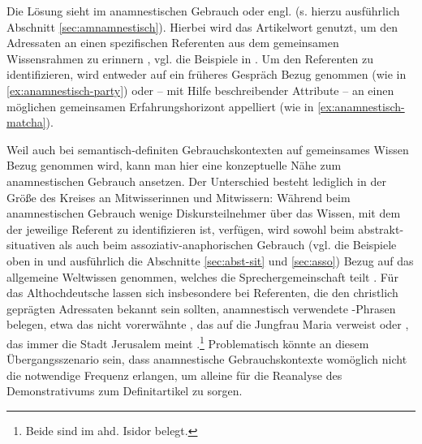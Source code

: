 Die Lösung sieht \textcite{Himmelmann1997} im anamnestischen Gebrauch oder engl.  (s. hierzu ausführlich Abschnitt \ref{sec:amnamnestisch}). Hierbei wird das Artikelwort genutzt, um den Adressaten an einen spezifischen Referenten aus dem gemeinsamen Wissensrahmen zu erinnern \parencite[61 und 81]{Himmelmann1997}, vgl. die Beispiele in . Um den Referenten zu identifizieren, wird  entweder auf ein früheres Gespräch Bezug genommen (wie in \ref{ex:anamnestisch-party}) oder -- mit Hilfe beschreibender Attribute --  an einen möglichen gemeinsamen Erfahrungshorizont appelliert (wie in \ref{ex:anamnestisch-matcha}).  

 \begin{exe}
	\ex 
	\begin{xlist} \label{ex:himmelmann}
		\ex \label{ex:anamnestisch-party}  
		\ex \label{ex:anamnestisch-matcha}   
		\end{xlist}
\end{exe}

\noindent
Weil auch bei semantisch-definiten Gebrauchskontexten auf gemeinsames Wissen Bezug genommen wird, kann man hier eine konzeptuelle Nähe zum anamnestischen Gebrauch ansetzen. Der Unterschied besteht lediglich 
in der Größe des Kreises an Mitwisserinnen und Mitwissern: Während beim anamnestischen Gebrauch wenige  Diskursteilnehmer über das Wissen, mit dem der jeweilige Referent zu identifizieren ist, verfügen, wird sowohl beim abstrakt-situativen als auch beim assoziativ-anaphorischen Gebrauch (vgl. die Beispiele oben in  und ausführlich die Abschnitte \ref{sec:abst-sit} und  \ref{sec:asso}) Bezug auf das allgemeine Weltwissen genommen, welches die Sprechergemeinschaft teilt \parencite[95]{Himmelmann1997}. Für das Althochdeutsche lassen sich insbesondere bei Referenten, die den christlich geprägten Adressaten bekannt sein sollten, anamnestisch verwendete -Phrasen belegen, etwa das nicht vorerwähnte ,  das auf die Jungfrau Maria verweist \parencite[74]{Szczepaniak2011a} oder , das immer die Stadt Jerusalem meint \parencite{Flick2018}.\footnote{Beide sind im ahd. Isidor belegt.} Problematisch könnte an diesem Übergangsszenario sein, dass anamnestische Gebrauchskontexte womöglich nicht die notwendige Frequenz erlangen, um alleine für die Reanalyse des Demonstrativums zum Definitartikel zu sorgen. 

